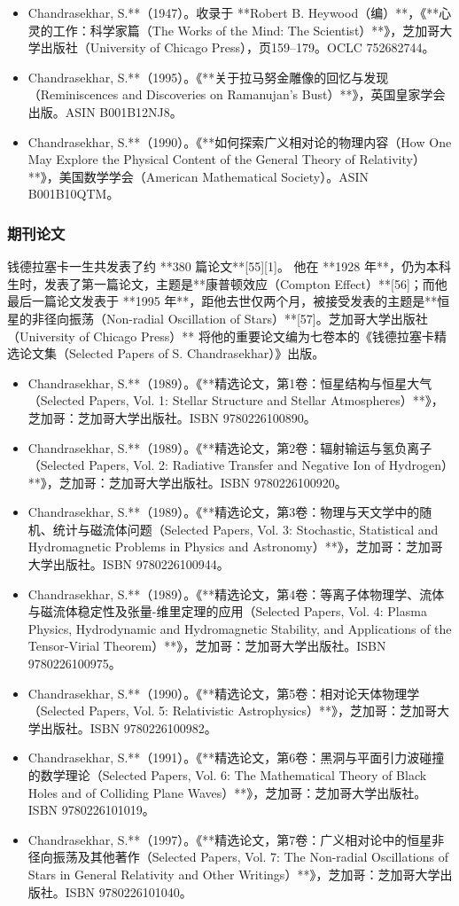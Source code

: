 \begin{itemize}
\item Chandrasekhar, S.**（1947）。收录于 **Robert B. Heywood（编）**，《**心灵的工作：科学家篇（The Works of the Mind: The Scientist）**》，芝加哥大学出版社（University of Chicago Press），页159–179。OCLC 752682744。
\item Chandrasekhar, S.**（1995）。《**关于拉马努金雕像的回忆与发现（Reminiscences and Discoveries on Ramanujan’s Bust）**》，英国皇家学会出版。ASIN B001B12NJ8。
\item Chandrasekhar, S.**（1990）。《**如何探索广义相对论的物理内容（How One May Explore the Physical Content of the General Theory of Relativity）**》，美国数学学会（American Mathematical Society）。ASIN B001B10QTM。
\end{itemize}
\subsubsection{期刊论文}
钱德拉塞卡一生共发表了约 **380 篇论文**[55][1]。
他在 **1928 年**，仍为本科生时，发表了第一篇论文，主题是**康普顿效应（Compton Effect）**[56]；而他最后一篇论文发表于 **1995 年**，距他去世仅两个月，被接受发表的主题是**恒星的非径向振荡（Non-radial Oscillation of Stars）**[57]。芝加哥大学出版社（University of Chicago Press）** 将他的重要论文编为七卷本的《钱德拉塞卡精选论文集（Selected Papers of S. Chandrasekhar）》出版。
\begin{itemize}
\item Chandrasekhar, S.**（1989）。《**精选论文，第1卷：恒星结构与恒星大气（Selected Papers, Vol. 1: Stellar Structure and Stellar Atmospheres）**》，芝加哥：芝加哥大学出版社。ISBN 9780226100890。
\item Chandrasekhar, S.**（1989）。《**精选论文，第2卷：辐射输运与氢负离子（Selected Papers, Vol. 2: Radiative Transfer and Negative Ion of Hydrogen）**》，芝加哥：芝加哥大学出版社。ISBN 9780226100920。
\item Chandrasekhar, S.**（1989）。《**精选论文，第3卷：物理与天文学中的随机、统计与磁流体问题（Selected Papers, Vol. 3: Stochastic, Statistical and Hydromagnetic Problems in Physics and Astronomy）**》，芝加哥：芝加哥大学出版社。ISBN 9780226100944。
\item Chandrasekhar, S.**（1989）。《**精选论文，第4卷：等离子体物理学、流体与磁流体稳定性及张量-维里定理的应用（Selected Papers, Vol. 4: Plasma Physics, Hydrodynamic and Hydromagnetic Stability, and Applications of the Tensor-Virial Theorem）**》，芝加哥：芝加哥大学出版社。ISBN 9780226100975。
\item Chandrasekhar, S.**（1990）。《**精选论文，第5卷：相对论天体物理学（Selected Papers, Vol. 5: Relativistic Astrophysics）**》，芝加哥：芝加哥大学出版社。ISBN 9780226100982。
\item Chandrasekhar, S.**（1991）。《**精选论文，第6卷：黑洞与平面引力波碰撞的数学理论（Selected Papers, Vol. 6: The Mathematical Theory of Black Holes and of Colliding Plane Waves）**》，芝加哥：芝加哥大学出版社。ISBN 9780226101019。
\item Chandrasekhar, S.**（1997）。《**精选论文，第7卷：广义相对论中的恒星非径向振荡及其他著作（Selected Papers, Vol. 7: The Non-radial Oscillations of Stars in General Relativity and Other Writings）**》，芝加哥：芝加哥大学出版社。ISBN 9780226101040。
\end{itemize}
